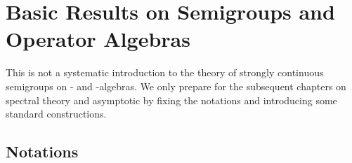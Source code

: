
\chapter{Basic Results on Semigroups and Operator Algebras}\label{chap:D-I}

This is not a systematic introduction to the theory of strongly continuous semigroups on \CA- and \WA-algebras.
We only prepare for the subsequent chapters on spectral theory and asymptotic by fixing the notations and introducing some standard constructions.

\section{Notations}\label{sec:d1-1}

